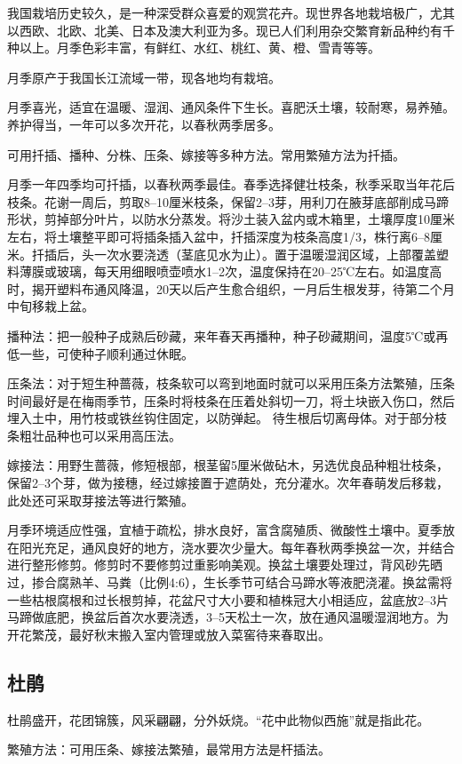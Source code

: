 \documentclass{ctexbook}
\begin{document}
我国栽培历史较久，是一种深受群众喜爱的观赏花卉。现世界各地栽培极广，尤其以西欧、北欧、北美、日本及澳大利亚为多。现已人们利用杂交繁育新品种约有千种以上。月季色彩丰富，有鲜红、水红、桃红、黄、橙、雪青等等。

月季原产于我国长江流域一带，现各地均有栽培。

月季喜光，适宜在温暖、湿润、通风条件下生长。喜肥沃土壤，较耐寒，易养殖。养护得当，一年可以多次开花，以春秋两季居多。

可用扦插、播种、分株、压条、嫁接等多种方法。常用繁殖方法为扦插。

月季一年四季均可扦插，以春秋两季最佳。春季选择健壮枝条，秋季采取当年花后枝条。花谢一周后，剪取8--10厘米枝条，保留2--3芽，用利刀在腋芽底部削成马蹄形状，剪掉部分叶片，以防水分蒸发。将沙土装入盆内或木箱里，土壤厚度10厘米左右，将土壤整平即可将插条插入盆中，扦插深度为枝条高度1/3，株行离6--8厘米。扦插后，头一次水要浇透（茎底见水为止）。置于温暖湿润区域，上部覆盖塑料薄膜或玻璃，每天用细眼喷壶喷水1--2次，温度保持在20--25℃左右。如温度高时，揭开塑料布通风降温，20天以后产生愈合组织，一月后生根发芽，待第二个月中旬移栽上盆。

播种法：把一般种子成熟后砂藏，来年春天再播种，种子砂藏期间，温度5℃或再低一些，可使种子顺利通过休眠。

压条法：对于短生种蔷薇，枝条软可以弯到地面时就可以采用压条方法繁殖，压条时间最好是在梅雨季节，压条时将枝条在压着处斜切一刀，将土块嵌入伤口，然后埋入土中，用竹枝或铁丝钩住固定，以防弹起。
待生根后切离母体。对于部分枝条粗壮品种也可以采用高压法。

嫁接法：用野生蔷薇，修短根部，根茎留5厘米做砧木，另选优良品种粗壮枝条，保留2--3个芽，做为接穗，经过嫁接置于遮荫处，充分灌水。次年春萌发后移栽，此处还可采取芽接法等进行繁殖。

月季环境适应性强，宜植于疏松，排水良好，富含腐殖质、微酸性土壤中。夏季放在阳光充足，通风良好的地方，浇水要次少量大。每年春秋两季换盆一次，并结合进行整形修剪。修剪时不要修剪过重影响美观。换盆土壤要处理过，背风砂先晒过，掺合腐熟羊、马粪（比例4:6），生长季节可结合马蹄水等液肥浇灌。换盆需将一些枯根腐根和过长根剪掉，花盆尺寸大小要和植株冠大小相适应，盆底放2--3片马蹄做底肥，换盆后首次水要浇透，3--5天松土一次，放在通风温暖湿润地方。为开花繁茂，最好秋末搬入室内管理或放入菜窖待来春取出。
\subsection{杜鹃}
杜鹃盛开，花团锦簇，风采翩翩，分外妖烧。“花中此物似西施”就是指此花。

繁殖方法：可用压条、嫁接法繁殖，最常用方法是杆插法。
\end{document}
